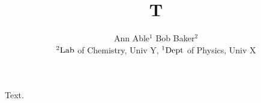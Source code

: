 \documentclass{article}
\begin{document}
\title{T}
\author{Ann Able$^{1}$ Bob Baker$^{2}$\\ ${\rm ^2Lab}$ of Chemistry, Univ Y, ${\rm ^1Dept}$ of Physics, Univ X}
\maketitle
Text.
\end{document}
